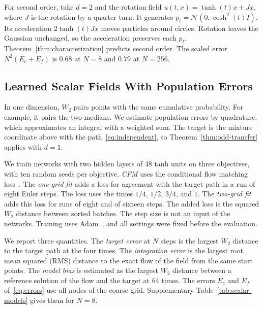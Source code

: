 For second order, take $d=2$ and the rotation field
$u(t,x)=\tanh(t)x+Jx$, where $J$ is the rotation by a quarter turn. It
generates $p_t=\mathcal N(0,\cosh^2(t)I)$. Its acceleration $2\tanh(t)Jx$ moves particles around circles.
Rotation leaves the Gaussian unchanged, so the acceleration preserves
each $p_t$. Theorem~\ref{thm:characterization} predicts second order.
The scaled error $N^2(E_c+E_f)$ is $0.68$ at $N=8$ and $0.79$ at $N=256$.

\subsection{Learned Scalar Fields With Population Errors}
\label{sec:scalar-learned}
In one dimension, $W_2$ pairs points with the same cumulative
probability. For example, it pairs the two medians. We estimate
population errors by quadrature, which approximates an integral with
a weighted sum. The target is the mixture
coordinate above with the path~\eqref{eq:independent}, so
Theorem~\ref{thm:odd-transfer} applies with $d=1$.

We train networks with two hidden layers of 48 tanh units on three
objectives, with ten random seeds per objective. \emph{CFM} uses the conditional flow
matching loss~\citep{lipman2023flow}. The \emph{one-grid fit} adds a
loss for agreement with the target path in a run of eight Euler steps.
The loss uses the times $1/4$, $1/2$, $3/4$, and $1$. The \emph{two-grid fit} adds
this loss for runs of eight and of sixteen steps. The added loss is the
squared $W_2$ distance between sorted batches. The step size is not an
input of the networks. Training uses
Adam~\citep{kingma2015adam}, and all settings were fixed before the
evaluation.

We report three quantities. The \emph{target error} at $N$ steps is the
largest $W_2$ distance to the target path at the four times. The
\emph{integration error} is the largest root mean squared (RMS) distance
to the exact flow of the field from the same start points. The
\emph{model bias} is estimated as the largest $W_2$ distance between
a reference solution of the flow and the target at 64 times. The errors $E_c$ and $E_f$
of~\eqref{eq:errors} use all nodes of the coarse grid. Supplementary
Table~\ref{tab:scalar-models} gives them for $N=8$.

\begin{table}[t]
\caption{Learned scalar fields: means over ten seeds of population
errors at $N$ Euler steps. The exact field is the conditional velocity,
without training. Supplementary Table~\ref{tab:scalar-models} gives each
field.}
\label{tab:scalar}
\centering
\footnotesize

\end{table}

